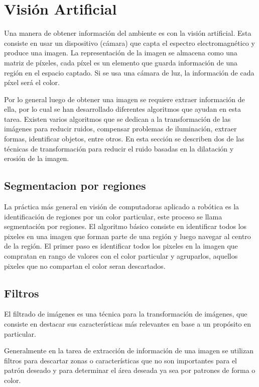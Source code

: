 \section{Visión Artificial} \label{sect:Vision_Artificial}

Una manera de obtener información del ambiente es con la visión artificial. Esta consiste en usar un dispositivo (cámara) que
capta el espectro electromagnético y produce una imagen. La representación de la imagen se almacena como una matriz de píxeles,
cada píxel es un elemento que guarda información de una región en el espacio captado. Si se usa una cámara de luz, la información
de cada píxel será el color. \cite{AiRobotics}  

Por lo general luego de obtener una imagen se requiere extraer información de ella, por lo cual se han desarrollado diferentes
algoritmos que ayudan en esta tarea. Existen varios algoritmos que se dedican a la transformación de las imágenes para reducir
ruidos, compensar problemas de iluminación, extraer formas, identificar objetos, entre otros. En esta sección se describen dos
de las técnicas de transformación para reducir el ruido basadas en la dilatación y erosión de la imagen. 
\subsection{Segmentacion por regiones}

La pr\'actica m\'as general en visi\'on de computadoras aplicado a rob\'otica es la identificaci\'on de regiones por un color particular, este proceso se llama segmentaci\'on por regiones. El algoritmo b\'asico consiste en  identificar todos los pixeles en una imagen que forman parte de una regi\'on y luego navegar al centro de la regi\'on. El primer paso es identificar todos los pixeles en la imagen que compratan en rango de valores con el color particular y agruparlos, aquellos pixeles que no compartan el color seran descartados.

\subsection{Filtros }
El filtrado de imágenes es una técnica para la transformación de imágenes, que consiste en destacar  sus características más relevantes en base a un propósito en particular. 

Generalmente en la tarea de extracción de información de una imagen se utilizan filtros para descartar zonas o características que no son importantes para el patrón deseado y para determinar el área deseada ya sea por patrones de forma o color.


